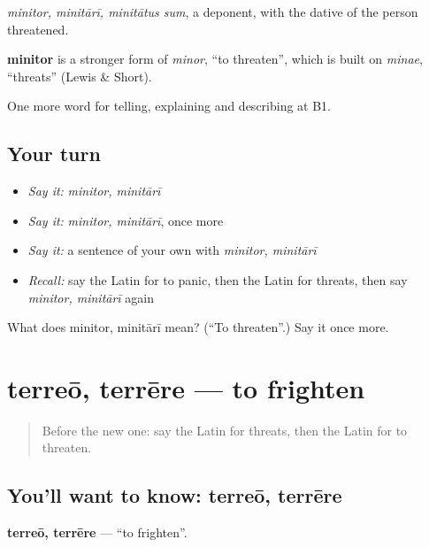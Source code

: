 \emph{minitor, minitārī, minitātus sum}, a deponent, with the dative of the person threatened.

\begin{cousinweb}
\textbf{minitor} is a stronger form of \emph{minor}, \textquotedblleft{}to threaten\textquotedblright{}, which is built on \emph{minae}, \textquotedblleft{}threats\textquotedblright{} (Lewis \& Short).
\end{cousinweb}

\begin{grammarlens}[title={What you've built}]
One more word for telling, explaining and describing at B1.
\end{grammarlens}

\subsection*{Your turn}
\begin{itemize}
\raggedright
  \item \emph{Say it:} \emph{minitor, minitārī}
  \item \emph{Say it:} \emph{minitor, minitārī}, once more
  \item \emph{Say it:} a sentence of your own with \emph{minitor, minitārī}
  \item \emph{Recall:} say the Latin for to panic, then the Latin for threats, then say \emph{minitor, minitārī} again
\end{itemize}

\begin{tcolorbox}[breakable,colback=teal!4,colframe=teal!35!black,title={Before you move on}]
What does minitor, minitārī mean? (\textquotedblleft{}To threaten\textquotedblright{}.) Say it once more.
\end{tcolorbox}
\section[terreō, terrēre]{terreō, terrēre — to frighten}

\label{lesson:LA-C321-terreo}



\begin{quote}
Before the new one: say the Latin for threats, then the Latin for to threaten.
\end{quote}

\subsection*{You'll want to know: terreō, terrēre}
\textbf{terreō, terrēre} — \textquotedblleft{}to frighten\textquotedblright{}.

